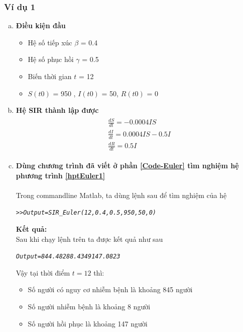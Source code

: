 \subsubsection{Ví dụ 1}\label{vd1-ppEuler}
\begin{enumerate}[a)]
\item \textbf{Điều kiện đầu}
	\begin{itemize}
		\item Hệ số tiếp xúc $ \beta $ = 0.4
		\item Hệ số phục hồi $ \gamma $ = 0.5
		\item Biến thời gian $ t $ = 12
		\item $ S(t0) $ = 950 , $ I(t0) $ = 50, $ R(t0) $ = 0
	\end{itemize}

\item \textbf {Hệ SIR thành lập được}
	\begin{align} \label{hptEuler1} \tag{I}
	    \begin{split} 
	        &\frac{dS}{dt} = -0.0004IS \\
	        &\frac{dI}{dt} = 0.0004IS - 0.5I \\
	        &\frac{dR}{dt} = 0.5I
	    \end{split}
	\end{align}
\item \textbf{Dùng chương trình đã viết ở  phần \ref{Code-Euler} tìm nghiệm hệ phương trình \eqref{hptEuler1} }\\
	\\Trong commandline Matlab, ta dùng lệnh sau để tìm nghiệm của hệ
	\begin{mdframed}[hidealllines=true,backgroundcolor=magenta!10]
	\begin{alltt}
	\textit{
	>> Output = SIR_Euler(12,0.4,0.5,950,50,0)
	}
	\end{alltt}
	\end{mdframed}

	\textbf{Kết quả:}\\
	Sau khi chạy lệnh trên ta được kết quả như sau
	\begin{mdframed}[hidealllines=true,backgroundcolor=blue!10]
	\begin{alltt}
	\textit{
	 Output = 844.4828    8.4349  147.0823
	}
	\end{alltt}
	\end{mdframed}
	Vậy tại thời điểm $ t = 12 $ thì:
	\begin{itemize}
		\item Số người có nguy cơ nhiễm bệnh là khoảng 845 người
		\item Số người nhiễm bệnh là khoảng 8 người
		\item Số người hồi phục là khoảng 147 người
	\end{itemize}


\end{enumerate}
